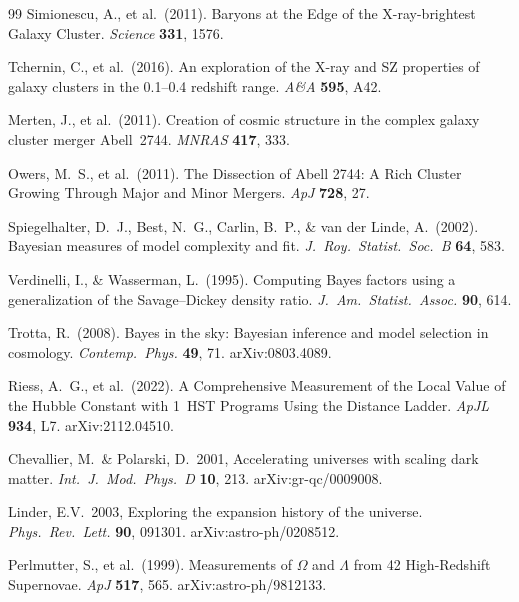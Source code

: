 \documentclass[12pt,a4paper]{article}
\begin{document}
\begin{thebibliography}{99}
Simionescu, A., et al.\ (2011).
Baryons at the Edge of the X-ray-brightest Galaxy Cluster.
\textit{Science} \textbf{331}, 1576.

Tchernin, C., et al.\ (2016).
An exploration of the X-ray and SZ properties of galaxy clusters in the 0.1--0.4 redshift range.
\textit{A\&A} \textbf{595}, A42.

Merten, J., et al.\ (2011).
Creation of cosmic structure in the complex galaxy cluster merger Abell~2744.
\textit{MNRAS} \textbf{417}, 333.

Owers, M.~S., et al.\ (2011).
The Dissection of Abell 2744: A Rich Cluster Growing Through Major and Minor Mergers.
\textit{ApJ} \textbf{728}, 27.

Spiegelhalter, D.~J., Best, N.~G., Carlin, B.~P., \& van der Linde, A.\ (2002).
Bayesian measures of model complexity and fit.
\textit{J.~Roy.\ Statist.\ Soc.~B} \textbf{64}, 583.

Verdinelli, I., \& Wasserman, L.\ (1995).
Computing Bayes factors using a generalization of the Savage--Dickey density ratio.
\textit{J.~Am.\ Statist.\ Assoc.} \textbf{90}, 614.

Trotta, R.\ (2008).
Bayes in the sky: Bayesian inference and model selection in cosmology.
\textit{Contemp.\ Phys.} \textbf{49}, 71. arXiv:0803.4089.

Riess, A.~G., et al.\ (2022).
A Comprehensive Measurement of the Local Value of the Hubble Constant with
1~HST Programs Using the Distance Ladder.
\textit{ApJL} \textbf{934}, L7. arXiv:2112.04510.

Chevallier, M.\ \& Polarski, D.\ 2001,
Accelerating universes with scaling dark matter.
\textit{Int.\ J.\ Mod.\ Phys.\ D} \textbf{10}, 213. arXiv:gr-qc/0009008.

Linder, E.V.\ 2003,
Exploring the expansion history of the universe.
\textit{Phys.\ Rev.\ Lett.} \textbf{90}, 091301. arXiv:astro-ph/0208512.

Perlmutter, S., et al.\ (1999).
Measurements of $\Omega$ and $\Lambda$ from 42 High-Redshift Supernovae.
\textit{ApJ} \textbf{517}, 565. arXiv:astro-ph/9812133.


\end{thebibliography}
\end{document}
